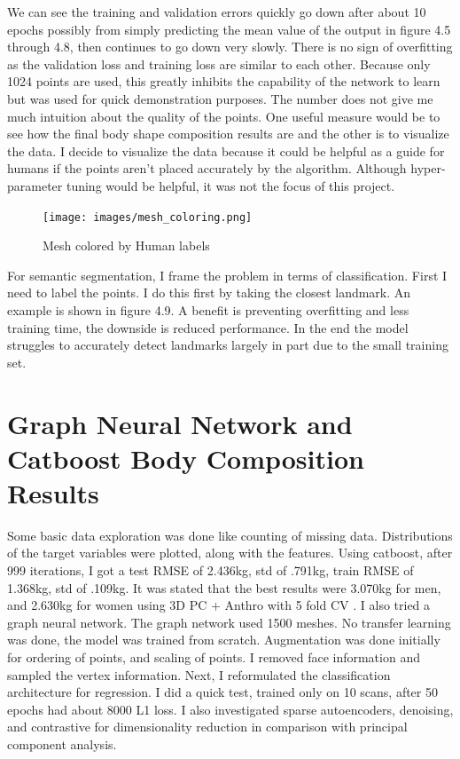 We can see the training and validation errors quickly go down after about 10 epochs possibly from simply predicting the mean value of the output in figure 4.5 through 4.8, then continues to go down very slowly. There is no sign of overfitting as the validation loss and training loss are similar to each other. Because only 1024 points are used, this greatly inhibits the capability of the network to learn but was used for quick demonstration purposes. The number does not give me much intuition about the quality of the points. One useful measure would be to see how the final body shape composition results are and the other is to visualize the data. I decide to visualize the data because it could be helpful as a guide for humans if the points aren't placed accurately by the algorithm. Although hyper-parameter tuning would be helpful, it was not the focus of this project. 

\begin{figure}[!htb]
	\caption{Mesh colored by Human labels}
	\centering
	\texttt{[image: images/mesh\_coloring.png]}
\end{figure}

For semantic segmentation, I frame the problem in terms of classification. First I need to label the points. I do this first by taking the closest landmark. An example is shown in figure 4.9. A benefit is preventing overfitting and less training time, the downside is reduced performance. In the end the model struggles to accurately detect landmarks largely in part due to the small training set.

\section{Graph Neural Network and Catboost Body Composition Results}

Some basic data exploration was done like counting of missing data. Distributions of the target variables were plotted, along with the features. Using catboost, after 999 iterations, I got a test RMSE of 2.436kg, std of .791kg, train RMSE of 1.368kg, std of .109kg. It was stated that the best results were 3.070kg for men, and 2.630kg for women using 3D PC + Anthro with 5 fold CV \cite{article}. I also tried a graph neural network. The graph network used 1500 meshes. No transfer learning was done, the model was trained from scratch. Augmentation was done initially for ordering of points, and scaling of points. I removed face information and sampled the vertex information. Next, I reformulated the classification architecture for regression. I did a quick test, trained only on 10 scans, after 50 epochs had about 8000 L1 loss. I also investigated sparse autoencoders, denoising, and contrastive for dimensionality reduction in comparison with principal component analysis.


